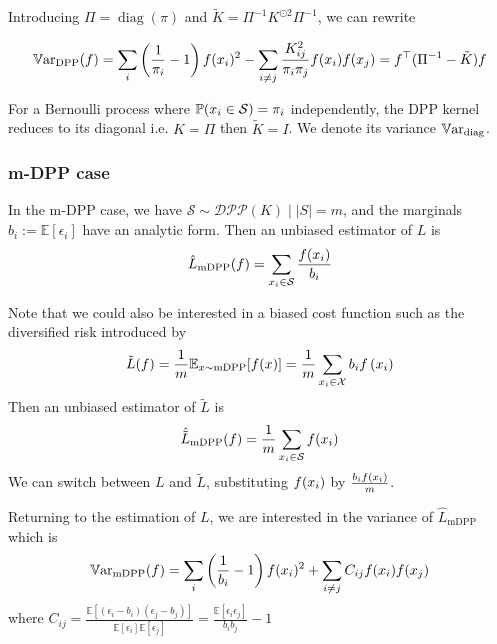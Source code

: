 Introducing $\Pi = \operatorname{diag}(\pi)$ and $\tilde K = \Pi^{-1}K^{\odot 2} \Pi^{-1}$, we can rewrite  

\begin{equation}
	\operatorname{\mathbb V ar}_{\textrm{DPP}}(f)=\sum_{i}\left(\frac{1}{\pi_{i}}-1\right) f(x_{i})^{2}-\sum_{i \neq j} \frac{K_{ij}^{2}}{\pi_{i} \pi_{j}} f(x_{i}) f(x_{j}) =  f^\top (\Pi^{-1}  - \tilde{K}) f 
\end{equation}

For a Bernoulli process where $\mathbb{P}(x_i \in \mathcal S) = \pi_i$ independently, the DPP kernel reduces to its diagonal i.e. $K = \Pi$ then $\tilde K = I$. We denote its variance $\operatorname{\mathbb V ar}_{\textrm{diag}}$.


\subsubsection{m-DPP case}

In the m-DPP case, we have $\mathcal S \sim \mathcal{DPP}(K) \mid |S|=m$, and the marginals $b_{i} := \mathbb{E}\left[\epsilon_{i}\right]$ have an analytic form. Then an unbiased estimator of $L$ is
\begin{equation*}
	\hat L_{\textrm{mDPP}}(f) = \sum_{x_i\in \mathcal S} \frac{f(x_i)}{b_i}
\end{equation*}

Note that we could also be interested in a biased cost function such as the diversified risk introduced by \cite{zhang2017dppminibatch}
$$
\tilde L(f) =\frac{1}{m}\mathbb{E}_{x \sim \textrm{mDPP}}[f(x)]=\frac{1}{m}\sum_{x_i \in \mathcal X} b_{i} f\left(x_{i}\right)
$$
Then an unbiased estimator of $\tilde L$ is
\begin{equation*}
	\hat{\tilde L}_{\textrm{mDPP}}(f) = \frac{1}{m}\sum_{x_i\in \mathcal S} f(x_i)
\end{equation*}
We can switch between $L$ and $\tilde L$, substituting $f(x_i)$ by $\frac{b_i f(x_i)}{m}$.

Returning to the estimation of $L$, we are interested in the variance of $\hat L_{\textrm{mDPP}}$ which is
\begin{equation}
	\operatorname{\mathbb V ar}_{\textrm{mDPP}}(f)=\sum_{i}\left(\frac{1}{b_i}-1\right) f(x_i)^2
	+ \sum_{i \neq j} C_{ij}f(x_i) f(x_j)
\end{equation}
where $C_{ij}=\frac{\mathbb{E}\left[\left(\epsilon_{i}-b_{i}\right)\left(\epsilon_{j}-b_{j}\right)\right]}{\mathbb{E}\left[\epsilon_{i}\right] \mathbb{E}\left[\epsilon_{j}\right]}=\frac{\mathbb{E}\left[\epsilon_{i} \epsilon_{j}\right]}{b_{i} b_{j}}-1
$

